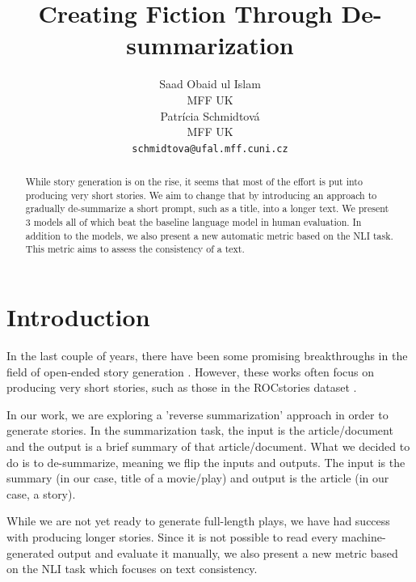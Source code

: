 \documentclass[11pt,a4paper]{article}
\title{Creating Fiction Through De-summarization}
\author{Saad Obaid ul Islam \\
  MFF UK \\\And
  Patrícia Schmidtová \\
  MFF UK \\
  \texttt{schmidtova@ufal.mff.cuni.cz}
  }
\date{}
\begin{document}
\maketitle
\begin{abstract}
While story generation is on the rise, it seems that most of the effort is put into producing very short stories. We aim to change that by introducing an approach to gradually de-summarize a short prompt, such as a title, into a longer text. We present 3 models all of which beat the baseline language model in human evaluation. In addition to the models, we also present a new automatic metric based on the NLI task. This metric aims to assess the consistency of a text.
\end{abstract}


\section{Introduction}
In the last couple of years, there have been some promising breakthroughs in the field of open-ended story generation \citep{fan_hierarchical_2018, clark_neural_2018, ammanabrolu_guided_2019}. However, these works often focus on producing very short stories, such as those in the ROCstories dataset \citep{rocstories}. 

In our work, we are exploring a 'reverse summarization' approach in order to generate stories. In the summarization task, the input is the article/document and the output is a brief summary of that article/document. What we decided to do is to de-summarize, meaning we flip the inputs and outputs. The input is the summary (in our case, title of a movie/play) and output is the article (in our case, a story).  

While we are not yet ready to generate full-length plays, we have had success with producing longer stories. Since it is not possible to read every machine-generated output and evaluate it manually, we also present a new metric based on the NLI task which focuses on text consistency. 
\end{document}
